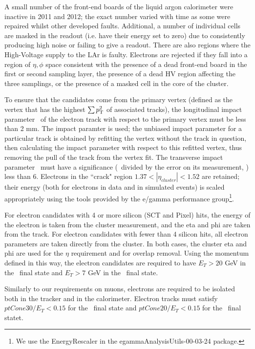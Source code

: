 A small number of the front-end boards of the liquid argon calorimeter were
inactive in 2011 and 2012; the exact number varied with time as some were
repaired whilst other developed faults. Additional, a number of individual cells
are masked in the readout (i.e. have their energy set to zero) due to
consistently producing high noise or failing to give a readout. There are also
regions where the High-Voltage supply to the LAr is faulty. Electrons are
rejected if they fall into a region of
$\eta, \phi$ space consistent with the presence of a dead front-end board in
the first or second sampling layer, the presence of a dead HV region affecting the
three samplings, or the presence of a masked cell in the core of the cluster.

To ensure that the candidates come from
the primary vertex (defined as the
vertex that has the highest $\sum{\ensuremath{p_{\mathrm{T}}}^2}$ of associated tracks), the
longitudinal impact parameter \zzero\ of the electron track with respect to the primary
vertex must be less than 2 mm. The  impact paramter is used;
the unbiased impact parameter for a particular track is obtained by refitting
the vertex without the track in question, then calculating the impact parameter
with respect to this refitted vertex, thus removing the pull of the track from
the vertex fit.
The transverse impact parameter \dzero\ must have a significance (\dzero\
divided by the error on its measurement, \dzerosig) less than 6.
Electrons in the ``crack" region $1.37 < |\eta_{cluster}| < 1.52$ are retained; 
their energy (both for electrons in data and in simulated events) is scaled 
appropriately using the tools provided by the e/gamma 
performance group\footnote{We use the EnergyRescaler in the egammaAnalysisUtils-00-03-24 package.}.

For electron candidates with 4 or more silicon (SCT and Pixel) hits, the energy of
the electron is taken from the cluster measurement, and the eta and phi
are taken from the track. For electron candidates with fewer than 4
silicon hits, all electron parameters are taken directly from the
cluster. In both cases, the cluster eta and phi are used for the $\eta$
requirement and for overlap removal. Using the momentum defined in this way, the electron
candidates are required to have $E_T > 20$ GeV in the \llvv\ final state and
$E_T > 7$ GeV in the \llll\ final state. 

Similarly to our requirements on muons, electrons are required to be isolated both in the tracker and in the calorimeter.
Electron tracks must satisfy $ptCone30/E_{T}<0.15$ for the \llvv\ final state
and $ptCone20/E_{T}<0.15$ for the \llll\ final statet. 


